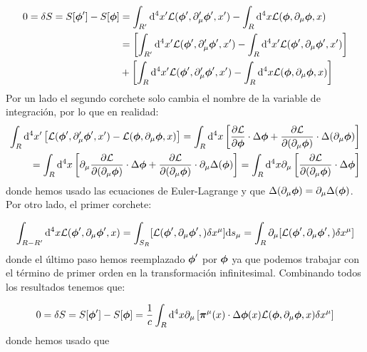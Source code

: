 \begin{equation}
	\begin{split}
		0 = \delta S = S[\boldsymbol{\phi}'] - S[\boldsymbol{\phi}] & = \int_{R'} \mathrm{d}^4 x' \mathcal{L}(\boldsymbol{\phi}',\partial_\mu'\boldsymbol{\phi}',x')-\int_R\mathrm{d}^4 x\mathcal{L}(\boldsymbol{\phi},\partial_\mu\boldsymbol{\phi},x) \\
		& =  \left[ \int_{R'} \mathrm{d}^4 x' \mathcal{L}(\boldsymbol{\phi}',\partial_\mu'\boldsymbol{\phi}',x')-\int_R\mathrm{d}^4 x'\mathcal{L}(\boldsymbol{\phi}',\partial_\mu\boldsymbol{\phi}',x')  \right]  \\
		& +\left[ \int_{R} \mathrm{d}^4 x' \mathcal{L}(\boldsymbol{\phi}',\partial_\mu'\boldsymbol{\phi}',x')-\int_R \mathrm{d}^4 x \mathcal{L}(\boldsymbol{\phi},\partial_\mu\boldsymbol{\phi},x)  \right]
	\end{split}
\end{equation}
Por un lado el segundo corchete solo cambia el nombre de la variable de integración, por lo que en realidad: 
\begin{equation}
	\begin{split}
	\int_{R} \mathrm{d}^4 x'\left[  \mathcal{L}(\boldsymbol{\phi}',\partial_\mu'\boldsymbol{\phi}',x') -  \mathcal{L}(\boldsymbol{\phi},\partial_\mu\boldsymbol{\phi},x)  \right] = \int_R \mathrm{d}^4 x \left[ \frac{\partial \mathcal{L}}{\partial \boldsymbol{\phi}} \cdot \Delta \boldsymbol{\phi} + \frac{\partial \mathcal{L}}{\partial (\partial_\mu \boldsymbol{\phi})} \cdot \Delta (\partial_\mu \boldsymbol{\phi})  \right]  \\
	= \int_R \mathrm{d}^4 x \left[ \partial_\mu\frac{\partial \mathcal{L}}{\partial (\partial_\mu\boldsymbol{\phi})} \cdot \Delta \boldsymbol{\phi} + \frac{\partial \mathcal{L}}{\partial (\partial_\mu \boldsymbol{\phi})} \cdot \partial_\mu\Delta ( \boldsymbol{\phi})  \right] = \int_R \mathrm{d}^4 x \partial_\mu\left[  \frac{\partial \mathcal{L}}{\partial (\partial_\mu \boldsymbol{\phi})} \cdot \Delta \boldsymbol{\phi}  \right]
	\end{split}
\end{equation}
donde hemos usado las ecuaciones de Euler-Lagrange y que $\Delta (\partial_\mu \boldsymbol{\phi}) = \partial_\mu\Delta ( \boldsymbol{\phi})$. Por otro lado, el primer corchete:

\begin{equation*}
	\int_{R-R'} \mathrm{d}^4 x\mathcal{L}(\boldsymbol{\phi}',\partial_\mu \boldsymbol{\phi}',x) = \int_{S_R} [\mathcal{L} (\boldsymbol{\phi}',\partial_\mu \boldsymbol{\phi}',) \delta x^\mu] \mathrm{d} s_\mu =  \int_{R} \partial_\mu[\mathcal{L} (\boldsymbol{\phi}',\partial_\mu \boldsymbol{\phi}',) \delta x^\mu] 
\end{equation*}
donde el último paso hemos reemplazado $\boldsymbol{\phi}'$ por $\boldsymbol{\phi}$ ya que podemos trabajar con el término de primer orden en la transformación infinitesimal. Combinando todos los resultados tenemos que:

\begin{equation}
	0 = \delta S = S[\boldsymbol{\phi}'] - S[\boldsymbol{\phi}] = \frac{1}{c} \int_R\mathrm{d}^4 x \partial_\mu \left[ \boldsymbol{\pi}^\mu (x) \cdot \Delta \boldsymbol{\phi} (x)  \mathcal{L} (\boldsymbol{\phi},\partial_\mu \boldsymbol{\phi},x) \delta x^\mu \right]
\end{equation}
donde hemos usado que 

